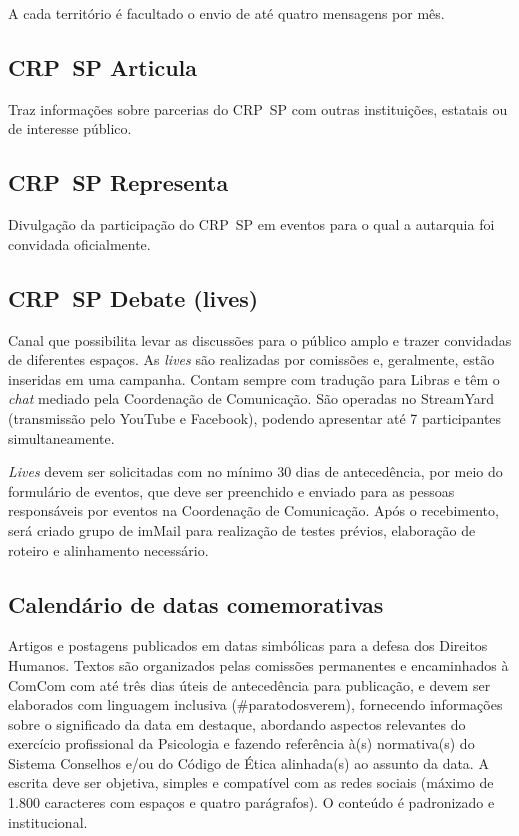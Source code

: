 A cada território é facultado o envio de até quatro mensagens por mês.

\subsection{CRP~SP Articula}

Traz informações sobre parcerias do CRP~SP com outras instituições,
estatais ou de interesse público.

\subsection{CRP~SP Representa}

Divulgação da participação do CRP~SP em eventos para o qual a autarquia
foi convidada oficialmente.

\subsection{CRP~SP Debate (lives)}

Canal que possibilita levar as discussões para o público amplo e trazer
convidadas de diferentes espaços. As \emph{lives} são realizadas por
comissões e, geralmente, estão inseridas em uma campanha. Contam sempre
com tradução para Libras e têm o \emph{chat} mediado pela Coordenação de
Comunicação. São operadas no StreamYard (transmissão pelo YouTube e
Facebook), podendo apresentar até 7 participantes simultaneamente.

\emph{Lives} devem ser solicitadas com no mínimo 30 dias de
antecedência, por meio do formulário de eventos, que deve ser preenchido
e enviado para as pessoas responsáveis por eventos na Coordenação de
Comunicação. Após o recebimento, será criado grupo de imMail para
realização de testes prévios, elaboração de roteiro e alinhamento
necessário.

\subsection{Calendário de datas
  comemorativas}

Artigos e postagens publicados em datas simbólicas para a defesa dos
Direitos Humanos. Textos são organizados pelas comissões permanentes e
encaminhados à ComCom com até três dias úteis de antecedência para
publicação, e devem ser elaborados com linguagem inclusiva
(\#paratodosverem), fornecendo informações sobre o significado da data
em destaque, abordando aspectos relevantes do exercício profissional da
Psicologia e fazendo referência à(s) normativa(s) do Sistema Conselhos
e/ou do Código de Ética alinhada(s) ao assunto da data. A escrita deve
ser objetiva, simples e compatível com as redes sociais (máximo de 1.800
caracteres com espaços e quatro parágrafos). O conteúdo é padronizado e
institucional.

